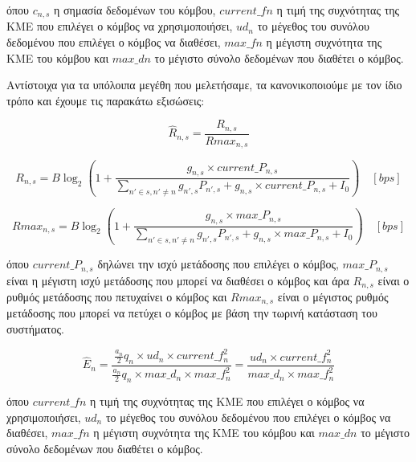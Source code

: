 \vspace{-3pt}

\noindent
όπου $c_{n,s}$ η σημασία δεδομένων του κόμβου, $current\_fn$ η τιμή της συχνότητας της ΚΜΕ που επιλέγει ο κόμβος να χρησιμοποιήσει, $ud_n$ το μέγεθος του συνόλου δεδομένου που επιλέγει ο κόμβος να διαθέσει, $max\_fn$ η μέγιστη συχνότητα της ΚΜΕ του κόμβου και $max\_dn$ το μέγιστο σύνολο δεδομένων που διαθέτει ο κόμβος.

Αντίστοιχα για τα υπόλοιπα μεγέθη που μελετήσαμε, τα κανονικοποιούμε με τον ίδιο τρόπο και έχουμε τις παρακάτω εξισώσεις:

\vspace{-5pt}

\begin{equation}
\hat{R}_{n,s} = \frac{R_{n,s}}{Rmax_{n,s}}
\label{eq21}
\end{equation}

\vspace{-3pt}

\[R_{n,s} = B \log_2(1 + \frac{g_{n,s}\times current\_P_{n,s}}{\sum \limits_{n'\in s, n'\neq n} g_{n',s}P_{n',s} + g_{n,s}\times current\_P_{n,s} + I_0}) \quad [bps]\]

\[Rmax_{n,s} = B \log_2(1 + \frac{g_{n,s}\times max\_P_{n,s}}{\sum \limits_{n'\in s, n'\neq n} g_{n',s}P_{n',s} + g_{n,s}\times max\_P_{n,s} + I_0}) \quad [bps]\]

\noindent
όπου $current\_P_{n,s}$ δηλώνει την ισχύ μετάδοσης που επιλέγει ο κόμβος, $max\_P_{n,s}$ είναι η μέγιστη ισχύ μετάδοσης που μπορεί να διαθέσει ο κόμβος και άρα $R_{n,s}$ είναι ο ρυθμός μετάδοσης που πετυχαίνει ο κόμβος και $Rmax_{n,s}$ είναι ο μέγιστος ρυθμός μετάδοσης που μπορεί να πετύχει ο κόμβος με βάση την τωρινή κατάσταση του συστήματος.

\vspace{-5pt}

\begin{equation}
\hat{E}_n=\frac{\frac{a_n}{2}q_n\times ud_n\times current\_f_n^2}{\frac{a_n}{2}q_n\times max\_d_n\times max\_f_n^2} = \frac{ud_n\times current\_f_n^2}{max\_d_n\times max\_f_n^2}
\label{eq22}
\end{equation}

\vspace{-3pt}

\noindent
όπου $current\_fn$ η τιμή της συχνότητας της ΚΜΕ που επιλέγει ο κόμβος να χρησιμοποιήσει, $ud_n$ το μέγεθος του συνόλου δεδομένου που επιλέγει ο κόμβος να διαθέσει, $max\_fn$ η μέγιστη συχνότητα της ΚΜΕ του κόμβου και $max\_dn$ το μέγιστο σύνολο δεδομένων που διαθέτει ο κόμβος.

